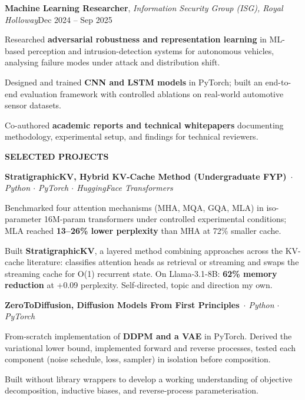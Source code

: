 \documentclass[a4paper,10pt]{article}
\newcommand{\cvsection}[1]{%
  \vspace{7pt}%
  {\bfseries\fontsize{11}{13}\selectfont\MakeUppercase{#1}}\par
  \vspace{1.5pt}{\color{black!75}\hrule height 0.6pt}\vspace{4pt}%
}
\newcommand{\job}[3]{%
  \noindent\textbf{#1}, \textit{#2}\hfill {\color{black!70}#3}\par\vspace{1.5pt}%
}
\newcommand{\project}[2]{%
  \noindent\textbf{#1}\,\textit{#2}\par\vspace{1pt}%
}
\newenvironment{tight}{%
  \begin{list}{\textbullet}{%
    \setlength{\leftmargin}{1.35em}\setlength{\labelsep}{0.5em}%
    \setlength{\itemsep}{1.0pt}\setlength{\parsep}{0pt}\setlength{\topsep}{2.5pt}%
    \setlength{\partopsep}{0pt}}%
}{\end{list}}
\begin{document}
\job{Machine Learning Researcher}{Information Security Group (ISG), Royal Holloway}{Dec 2024 – Sep 2025}
\begin{tight}
  \item Researched \textbf{adversarial robustness and representation learning} in ML-based perception and intrusion-detection systems for autonomous vehicles, analysing failure modes under attack and distribution shift.
  \item Designed and trained \textbf{CNN and LSTM models} in PyTorch; built an end-to-end evaluation framework with controlled ablations on real-world automotive sensor datasets.
  \item Co-authored \textbf{academic reports and technical whitepapers} documenting methodology, experimental setup, and findings for technical reviewers.
\end{tight}

\newpage
\cvsection{Selected Projects}

\project{StratigraphicKV, Hybrid KV-Cache Method (Undergraduate FYP)}{ $\cdot$ Python $\cdot$ PyTorch $\cdot$ HuggingFace Transformers}
\begin{tight}
  \item Benchmarked four attention mechanisms (MHA, MQA, GQA, MLA) in iso-parameter 16M-param transformers under controlled experimental conditions; MLA reached \textbf{13–26\% lower perplexity} than MHA at 72\% smaller cache.
  \item Built \textbf{StratigraphicKV}, a layered method combining approaches across the KV-cache literature: classifies attention heads as retrieval or streaming and swaps the streaming cache for O(1) recurrent state. On Llama-3.1-8B: \textbf{62\% memory reduction} at +0.09 perplexity. Self-directed, topic and direction my own.
\end{tight}
\vspace{3pt}

\project{ZeroToDiffusion, Diffusion Models From First Principles}{ $\cdot$ Python $\cdot$ PyTorch}
\begin{tight}
  \item From-scratch implementation of \textbf{DDPM and a VAE} in PyTorch. Derived the variational lower bound, implemented forward and reverse processes, tested each component (noise schedule, loss, sampler) in isolation before composition.
  \item Built without library wrappers to develop a working understanding of objective decomposition, inductive biases, and reverse-process parameterisation.
\end{tight}
\vspace{3pt}
\end{document}
